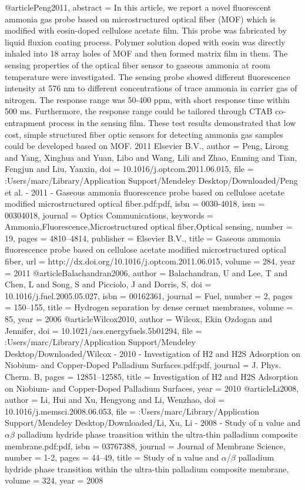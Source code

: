 @article{Peng2011,
abstract = {In this article, we report a novel fluorescent ammonia gas probe based on microstructured optical fiber (MOF) which is modified with eosin-doped cellulose acetate film. This probe was fabricated by liquid fluxion coating process. Polymer solution doped with eosin was directly inhaled into 18 array holes of MOF and then formed matrix film in them. The sensing properties of the optical fiber sensor to gaseous ammonia at room temperature were investigated. The sensing probe showed different fluorescence intensity at 576 nm to different concentrations of trace ammonia in carrier gas of nitrogen. The response range was 50-400 ppm, with short response time within 500 ms. Furthermore, the response range could be tailored through CTAB co-entrapment process in the sensing film. These test results demonstrated that low cost, simple structured fiber optic sensors for detecting ammonia gas samples could be developed based on MOF. {\textcopyright} 2011 Elsevier B.V.},
author = {Peng, Lirong and Yang, Xinghua and Yuan, Libo and Wang, Lili and Zhao, Enming and Tian, Fengjun and Liu, Yanxin},
doi = {10.1016/j.optcom.2011.06.015},
file = {:Users/marc/Library/Application Support/Mendeley Desktop/Downloaded/Peng et al. - 2011 - Gaseous ammonia fluorescence probe based on cellulose acetate modified microstructured optical fiber.pdf:pdf},
isbn = {0030-4018},
issn = {00304018},
journal = {Optics Communications},
keywords = {Ammonia,Fluorescence,Microstructured optical fiber,Optical sensing},
number = {19},
pages = {4810--4814},
publisher = {Elsevier B.V.},
title = {{Gaseous ammonia fluorescence probe based on cellulose acetate modified microstructured optical fiber}},
url = {http://dx.doi.org/10.1016/j.optcom.2011.06.015},
volume = {284},
year = {2011}
}
@article{Balachandran2006,
author = {Balachandran, U and Lee, T and Chen, L and Song, S and Picciolo, J and Dorris, S},
doi = {10.1016/j.fuel.2005.05.027},
isbn = {00162361},
journal = {Fuel},
number = {2},
pages = {150--155},
title = {{Hydrogen separation by dense cermet membranes}},
volume = {85},
year = {2006}
}
@article{Wilcox2010,
author = {Wilcox, Ekin Ozdogan and Jennifer},
doi = {10.1021/acs.energyfuels.5b01294},
file = {:Users/marc/Library/Application Support/Mendeley Desktop/Downloaded/Wilcox - 2010 - Investigation of H2 and H2S Adsorption on Niobium- and Copper-Doped Palladium Surfaces.pdf:pdf},
journal = {J. Phys. Cherm. B},
pages = {12851--12585},
title = {{Investigation of H2 and H2S Adsorption on Niobium- and Copper-Doped Palladium Surfaces}},
year = {2010}
}
@article{Li2008,
author = {Li, Hui and Xu, Hengyong and Li, Wenzhao},
doi = {10.1016/j.memsci.2008.06.053},
file = {:Users/marc/Library/Application Support/Mendeley Desktop/Downloaded/Li, Xu, Li - 2008 - Study of n value and $\alpha$$\beta$ palladium hydride phase transition within the ultra-thin palladium composite membrane.pdf:pdf},
isbn = {03767388},
journal = {Journal of Membrane Science},
number = {1-2},
pages = {44--49},
title = {{Study of n value and $\alpha$/$\beta$ palladium hydride phase transition within the ultra-thin palladium composite membrane}},
volume = {324},
year = {2008}
}
